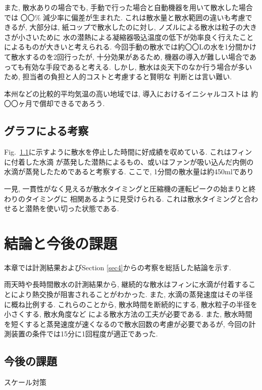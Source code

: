 \documentclass[a4j,fleqn,dvipdfmx,uplatex]{jsarticle}
\newcommand{\figref}[1]{Fig.\ \ref{#1}}
\newcommand{\secref}[1]{Section \ref{#1}\hspace{0.2zw}}
\begin{document}
また, 散水ありの場合でも, 手動で行った場合と自動機器を用いて散水した場合では
〇〇\% 減少率に偏差が生まれた. これは散水量と散水範囲の違いも考慮できるが, 
大部分は, 紙コップで散水したのに対し, ノズルによる散水は粒子の大きさが小さいために
水の潜熱による凝縮器吸込温度の低下が効率良く行えたことによるものが大きいと考えられる. 
今回手動の散水では約〇〇Lの水を1分間かけて散水するのを2回行ったが, 十分効果があるため, 
機器の導入が難しい場合であっても有効な手段であると考える. 
しかし, 散水は炎天下のなか行う場合が多いため, 担当者の負担と人的コストと考慮すると賢明な
判断とは言い難い. 

本州などの比較的平均気温の高い地域では, 導入におけるイニシャルコストは
約〇〇ヶ月で償却できるであろう. 



\subsection{グラフによる考察}
\figref{}に示すように散水を停止した時間に好成績を収めている. これはフィンに付着した水滴
が蒸発した潜熱によるもの、或いはファンが吸い込んだ内側の水滴が蒸発したためであると考察する. 
ここで, 1分間の散水量は約450mlであり

一見, 一貫性がなく見えるが散水タイミングと圧縮機の運転ピークの始まりと終わりのタイミングに
相関あるように見受けられる. これは散水タイミングと合わせると潜熱を使い切った状態である. 


\section{結論と今後の課題}
本章では計測結果および\secref{sec4}からの考察を総括した結論を示す. 

雨天時や長時間散水の計測結果から, 継続的な散水はフィンに水滴が付着することにより熱交換が阻害されることがわかった. 
また, 水滴の蒸発速度はその半径に概ね比例する. 
これらのことから, 散水時間を断続的にする, 散水粒子の半径を小さくする, 散水角度など
による散水方法の工夫が必要である. 
また, 散水時間を短くすると蒸発速度が速くなるので散水回数の考慮が必要であるが, 
今回の計測装置の条件では15分に1回程度が適正であった. 

\subsection{今後の課題}
\cite{thesis3} スケール対策
\end{document}
